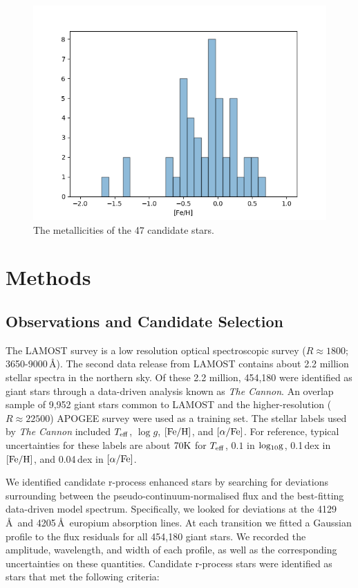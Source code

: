 \documentclass[a4paper,fleqn,usenatbib]{mnras}
\begin{document}
	\begin{figure}
		\includegraphics[width=\columnwidth]{metalhistpython}
		\caption{The metallicities of the 47 candidate stars.}
		\label{fig:starindex_423451}
	\end{figure}
	
	\section{Methods}
	
	\subsection{Observations and Candidate Selection}
	
	The LAMOST survey is a low resolution optical spectroscopic survey ($R\approx1800$; 3650-9000\,\AA). The second data release from  LAMOST \citep{lamost} contains about 2.2 million stellar spectra in the northern sky. Of these 2.2 million, 454,180 were identified as giant stars through a data-driven analysis known as \textit{The Cannon}. An overlap sample of 9,952 giant stars common to LAMOST and the higher-resolution ($R\approx22500$) APOGEE survey \citep{apogee} were used as a training set.
	The stellar labels used by \textit{The Cannon} included $T_{\rm{eff}}$, $\log{g}$, $\rm{[Fe/H]}$, and $\rm{[\alpha/Fe]}$. For reference, typical uncertainties for these labels are about $70\rm{K}$ for $T_{\rm{eff}}$, $0.1$ in $\rm{log_{10}{g}}$, 0.1\,dex in $\rm{[Fe/H]}$, and 0.04\,dex in $\rm{[\alpha/Fe]}$.
	
	We identified candidate r-process enhanced stars by searching for deviations surrounding between the pseudo-continuum-normalised flux and the best-fitting data-driven model spectrum. Specifically, we looked for deviations at the 4129\,\AA\ and 4205\,\AA\ europium absorption lines. At each transition we fitted a Gaussian profile to the flux residuals for all 454,180 giant stars. We recorded the amplitude, wavelength, and width of each profile, as well as the corresponding uncertainties on these quantities. 
	 Candidate r-process stars were identified as stars that met the following criteria:
	
\end{document}

